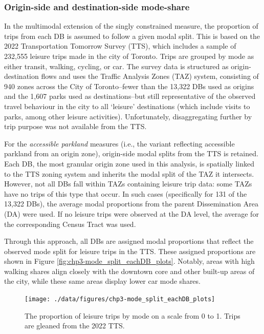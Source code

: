 \documentclass[
11pt, %
oneside, %
english, %
singlespacing, %
]{macthesis} %
\begin{document}
\subsubsection{Origin-side and destination-side mode-share}\label{origin-side-and-destination-side-mode-share}

In the multimodal extension of the singly constrained measure, the proportion of trips from each DB is assumed to follow a given modal split. This is based on the 2022 Transportation Tomorrow Survey (TTS), which includes a sample of 232,555 leisure trips made in the city of Toronto. Trips are grouped by mode as either transit, walking, cycling, or car. The survey data is structured as origin-destination flows and uses the Traffic Analysis Zones (TAZ) system, consisting of 940 zones across the City of Toronto--fewer than the 13,322 DBs used as origins and the 1,607 parks used as destinations--but still representative of the observed travel behaviour in the city to all `leisure' destinations (which include visits to parks, among other leisure activities). Unfortunately, disaggregating further by trip purpose was not available from the TTS.

For the \emph{accessible parkland} measures (i.e., the variant reflecting accessible parkland from an origin zone), origin-side modal splits from the TTS is retained. Each DB, the most granular origin zone used in this analysis, is spatially linked to the TTS zoning system and inherits the modal split of the TAZ it intersects. However, not all DBs fall within TAZs containing leisure trip data: some TAZs have no trips of this type that occur. In such cases (specifically for 131 of the 13,322 DBs), the average modal proportions from the parent Dissemination Area (DA) were used. If no leisure trips were observed at the DA level, the average for the corresponding Census Tract was used.

Through this approach, all DBs are assigned modal proportions that reflect the observed mode split for leisure trips in the TTS. These assigned proportions are shown in Figure \ref{fig:chp3-mode_split_eachDB_plots}. Notably, areas with high walking shares align closely with the downtown core and other built-up areas of the city, while these same areas display lower car mode shares.

\begin{figure}

{\centering \texttt{[image: ./data/figures/chp3-mode\_split\_eachDB\_plots]} 

}

\caption{\label{fig:chp3-mode_split_eachDB_plots}  The proportion of leisure trips by mode on a scale from 0 to 1. Trips are gleaned from the 2022 TTS. }\label{fig:unnamed-chunk-52}
\end{figure}
\end{document}
